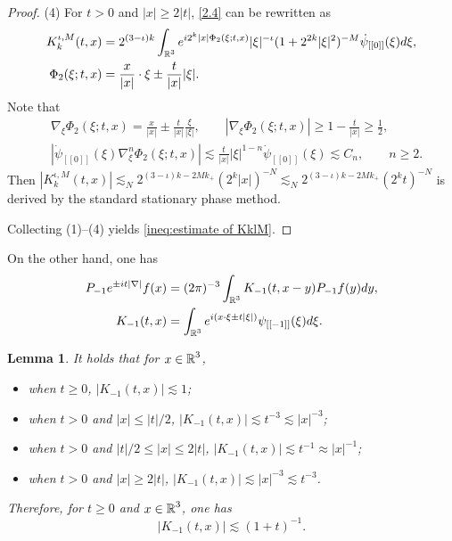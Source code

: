 \documentclass[11pt,twoside]{article}
\def\R{\mathop{\mathbb R\kern 0pt}\nolimits}
\def\f{\frac}
\def\ls{\lesssim}
\theoremstyle{plain}
\newtheorem{lemma}[theorem]{Lemma}
\theoremstyle{definition}
\numberwithin{equation}{section}
\begin{document}
\begin{proof}
		(4) For $t>0$ and $|x|\ge 2|t|$, \eqref{2.4} can be rewritten as
		\begin{equation*}
			\begin{split}
				K_k^{\iota,M}(t,x)&=2^{(3-\iota)k}\int_{\R^3}e^{i2^k|x|\Phi_2(\xi;t,x)}|\xi|^{-\iota}(1+2^{2k}|\xi|^2)^{-M}\dot{\psi}_{[[0]]}(\xi)d\xi,\\
				\Phi_2(\xi;t,x)&=\f{x}{|x|}\cdot\xi \pm \f{t}{|x|}|\xi|.
			\end{split}	
		\end{equation*}
		Note that
		\begin{equation*}
			\begin{split}
				&\nabla_\xi \Phi_2(\xi;t,x)=\f{x}{|x|} \pm \f{t}{|x|}\f{\xi}{|\xi|},\qquad |\nabla_\xi \Phi_2(\xi;t,x)|\ge 1-\f{t}{|x|}\ge \f{1}{2},\\
				&|\dot{\psi}_{[[0]]}(\xi)\nabla_\xi^n \Phi_2(\xi;t,x)|\ls \f{t}{|x|}|\xi|^{1-n}\dot{\psi}_{[[0]]}(\xi)\ls C_n,\qquad n\ge 2.
			\end{split}
		\end{equation*}
		Then $|K_k^{\iota,M}(t,x)|\ls_N 2^{(3-\iota)k-2Mk_+}(2^k|x|)^{-N}\ls_N 2^{(3-\iota)k-2Mk_+}(2^kt)^{-N}$
is derived by the standard stationary phase method.

 Collecting (1)--(4) yields \eqref{ineq:estimate of KklM}.
 		\end{proof}
On the other hand, one has
	\begin{equation}\label{def:K-1}
		\begin{split}
			P_{-1}e^{\pm it|\nabla|}f(x)&=(2\pi)^{-3}\int_{\R^3}K_{-1}(t,x-y)P_{-1}f(y)dy,\\
			K_{-1}(t,x)&=\int_{\R^3}e^{i(x\cdot\xi\pm t|\xi|)}\psi_{[[-1]]}(\xi)d\xi.
		\end{split}
	\end{equation}

	\begin{lemma}\label{lem:estimate of K-1}
		It holds that for $x\in \R^3$,
		\begin{itemize}
			\item[(1)] when $t\ge 0$, $|K_{-1}(t,x)|\ls 1$;
			\item[(2)] when $t>0$ and $|x|\le |t|/2$, $|K_{-1}(t,x)|\ls t^{-3}\ls |x|^{-3}$;
			\item[(3)] when $t>0$ and $|t|/2\le |x|\le 2|t|$,  $|K_{-1}(t,x)|\ls t^{-1}\approx |x|^{-1}$;
			\item[(4)] when $t>0$ and $|x|\ge 2|t|$,  $|K_{-1}(t,x)|\ls |x|^{-3}\ls t^{-3}$.
		\end{itemize}
		Therefore, for $t\ge 0$ and $x\in\R^3$, one has
		\begin{equation}\label{ineq:estimate of K-1}
			|K_{-1}(t,x)|\ls (1+t)^{-1}.
		\end{equation}
	\end{lemma}
\end{document}
